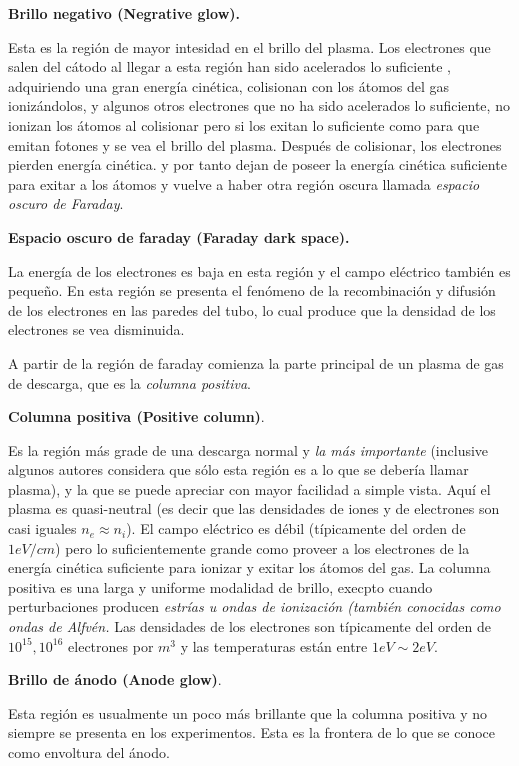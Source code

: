 \documentclass[letterpaper,12pt]{article}
\begin{document}
\textbf{Brillo negativo (Negrative glow).}

Esta es la región de mayor intesidad en el brillo del plasma.  Los electrones que salen del cátodo al llegar a esta región han sido acelerados lo suficiente , adquiriendo una gran energía cinética, colisionan con los átomos del gas ionizándolos, y algunos otros electrones que no ha sido acelerados lo suficiente, no ionizan los átomos al colisionar pero si los exitan lo suficiente como para que emitan fotones y se vea el brillo del plasma. Después de colisionar, los electrones pierden energía cinética.  y por tanto dejan de poseer la energía cinética suficiente para exitar a los átomos y vuelve a haber otra región oscura llamada \textit{espacio oscuro de Faraday}.

\textbf{Espacio oscuro de faraday (Faraday dark space).}

La energía de los electrones es baja en esta región y el campo eléctrico también es pequeño. En esta región se presenta el fenómeno de la recombinación y difusión de los electrones en las paredes del tubo, lo cual produce que la densidad de los electrones se vea disminuida.

A partir de la región de faraday comienza la parte principal de un plasma de gas de descarga, que es la \textit{columna positiva}.

\textbf{Columna positiva (Positive column)}.

Es la región más grade de una descarga normal y \textit{la más importante} (inclusive algunos autores considera que sólo esta región es a lo que se debería llamar plasma),  y la que se puede apreciar con mayor facilidad a simple vista. Aquí el plasma es quasi-neutral (es decir que las densidades de iones y de electrones son casi iguales $n_e \approx n_i$). El campo eléctrico es débil (típicamente del orden de $1eV/cm$) pero lo suficientemente grande como proveer a los electrones de la energía cinética suficiente para ionizar y exitar los átomos del gas. La columna positiva es una larga y uniforme modalidad de brillo, execpto cuando perturbaciones producen \textit{estrías u ondas de ionización (también conocidas como ondas de Alfvén.} Las densidades de los electrones son típicamente del orden de $10^{15},10^{16}$ electrones por $m^3$ y las temperaturas están entre $1eV \sim 2eV$. 

\textbf{Brillo de ánodo (Anode glow)}.

Esta región es usualmente un poco  más brillante que  la columna positiva y no siempre se presenta en los experimentos. Esta es la frontera de lo que se conoce como envoltura del ánodo.
\end{document}
